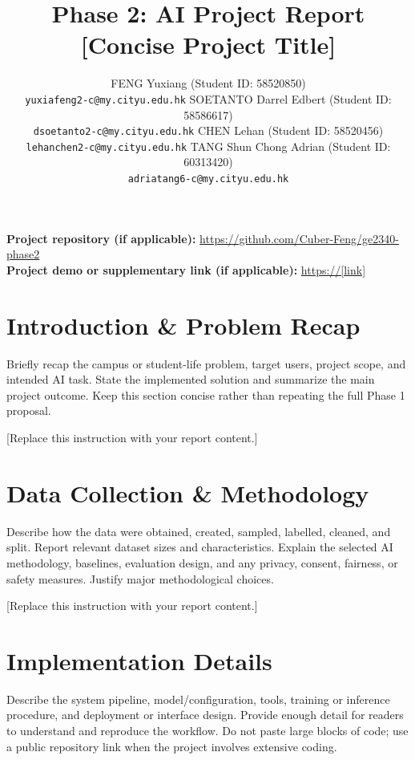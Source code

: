 \documentclass{article}
\title{Phase 2: AI Project Report\\
\large [Concise Project Title]}
\author{
  FENG Yuxiang (Student ID: 58520850)\\
  \texttt{yuxiafeng2-c@my.cityu.edu.hk}
  \And 
  SOETANTO Darrel Edbert (Student ID: 58586617)\\
  \texttt{dsoetanto2-c@my.cityu.edu.hk}
  \AND
  CHEN Lehan (Student ID: 58520456)\\
  \texttt{lehanchen2-c@my.cityu.edu.hk}
  \And
  TANG Shun Chong Adrian (Student ID: 60313420)\\
  \texttt{adriatang6-c@my.cityu.edu.hk}
}
\begin{document}
\maketitle

\noindent\textbf{Project repository (if applicable):} \url{https://github.com/Cuber-Feng/ge2340-phase2}\\
\textbf{Project demo or supplementary link (if applicable):} \url{https://[link]}


\section{Introduction \& Problem Recap}
Briefly recap the campus or student-life problem, target users, project scope, and intended AI task. State the implemented solution and summarize the main project outcome. Keep this section concise rather than repeating the full Phase 1 proposal.

[Replace this instruction with your report content.]

\section{Data Collection \& Methodology}
Describe how the data were obtained, created, sampled, labelled, cleaned, and split. Report relevant dataset sizes and characteristics. Explain the selected AI methodology, baselines, evaluation design, and any privacy, consent, fairness, or safety measures. Justify major methodological choices.

[Replace this instruction with your report content.]

\section{Implementation Details}
Describe the system pipeline, model/configuration, tools, training or inference procedure, and deployment or interface design. Provide enough detail for readers to understand and reproduce the workflow. Do not paste large blocks of code; use a public repository link when the project involves extensive coding.

\end{document}
